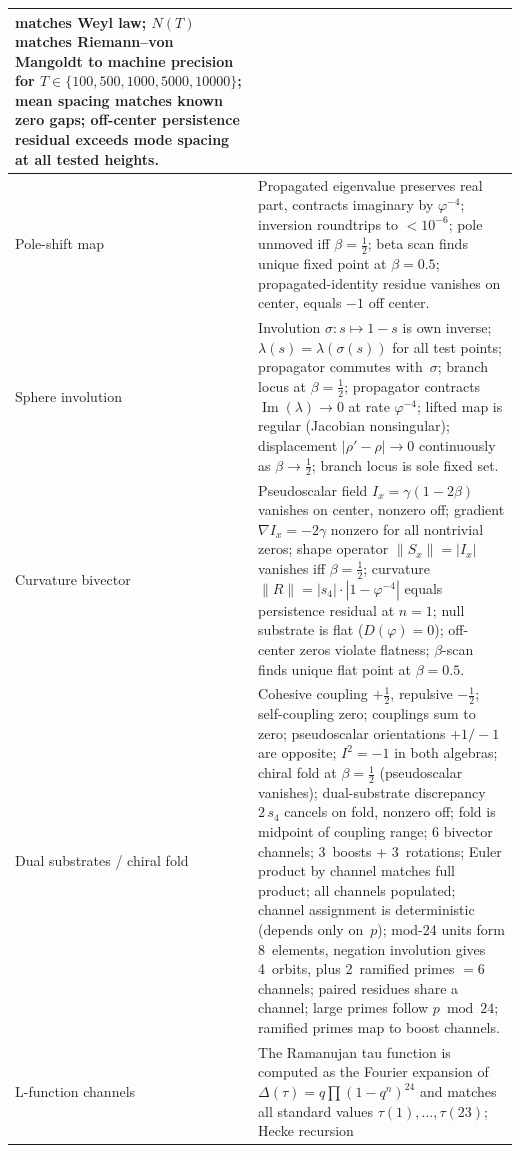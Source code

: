 \documentclass[11pt,a4paper]{article}
\theoremstyle{plain}
\theoremstyle{definition}
\theoremstyle{remark}
\numberwithin{equation}{section}
\newcommand{\vp}{\varphi}
\begin{document}
\begin{longtable}{>{\raggedright\arraybackslash}p{3.1cm}>{\raggedright\arraybackslash}p{9.1cm}}
matches Weyl law; \(N(T)\) matches Riemann--von Mangoldt to machine
precision for \(T\in\{100,500,1000,5000,10000\}\); mean spacing
matches known zero gaps; off-center persistence residual exceeds
mode spacing at all tested heights. \\
\midrule
Pole-shift map &
Propagated eigenvalue preserves real part, contracts imaginary by
\(\vp^{-4}\); inversion roundtrips to \(<10^{-6}\); pole unmoved iff
\(\beta=\tfrac12\); beta scan finds unique fixed point at
\(\beta=0.5\); propagated-identity residue vanishes on center,
equals \(-1\) off center. \\
\midrule
Sphere involution &
Involution \(\sigma\colon s\mapsto1{-}s\) is own inverse;
\(\lambda(s)=\lambda(\sigma(s))\) for all test points;
propagator commutes with~\(\sigma\); branch locus at
\(\beta=\tfrac12\); propagator contracts
\(\operatorname{Im}(\lambda)\to0\) at rate \(\vp^{-4}\);
lifted map is regular (Jacobian nonsingular);
displacement \(|\rho'{-}\rho|\to0\) continuously as
\(\beta\to\tfrac12\); branch locus is sole fixed set. \\
\midrule
Curvature bivector &
Pseudoscalar field \(I_x=\gamma(1{-}2\beta)\) vanishes on center,
nonzero off; gradient \(\nabla I_x=-2\gamma\) nonzero for all
nontrivial zeros; shape operator \(\|S_x\|=|I_x|\) vanishes iff
\(\beta=\tfrac12\); curvature \(\|R\|=|s_4|\cdot|1{-}\vp^{-4}|\)
equals persistence residual at \(n=1\); null substrate is flat
(\(D(\vp)=0\)); off-center zeros violate flatness;
\(\beta\)-scan finds unique flat point at \(\beta=0.5\). \\
\midrule
Dual substrates / chiral fold &
Cohesive coupling \(+\tfrac12\), repulsive \(-\tfrac12\); self-coupling
zero; couplings sum to zero; pseudoscalar orientations \(+1/-1\) are
opposite; \(I^2=-1\) in both algebras; chiral fold at
\(\beta=\tfrac12\) (pseudoscalar vanishes); dual-substrate discrepancy
\(2\,s_4\) cancels on fold, nonzero off; fold is midpoint of coupling
range; 6 bivector channels; 3~boosts + 3~rotations; Euler product by
channel matches full product; all channels populated; channel assignment
is deterministic (depends only on~\(p\)); mod-24 units form 8~elements,
negation involution gives 4~orbits, plus 2~ramified primes \(=6\)
channels; paired residues share a channel; large primes follow
\(p\bmod24\); ramified primes map to boost channels. \\
\midrule
L-function channels &
The Ramanujan tau function is computed as the Fourier expansion of
\(\Delta(\tau)=q\prod(1-q^n)^{24}\) and matches all standard values
\(\tau(1),\ldots,\tau(23)\); Hecke recursion

\end{longtable}
\end{document}

